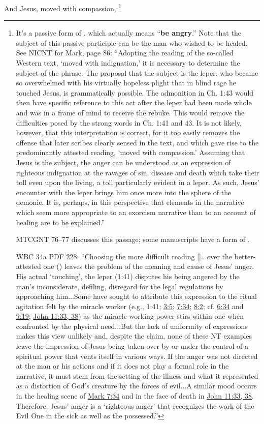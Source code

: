 			And Jesus, moved with compassion,%
				\footnote{%
					It's a passive form of , which actually means ``\textbf{be angry}.'' Note that the subject of this passive participle can be the man who wished to be healed. See NICNT for Mark, page 86: ``Adopting the reading of the so-called Western text, `moved with indignation,' it is necessary to determine the subject of the phrase. The proposal that the subject is the leper, who became so overwhelmed with his virtually hopeless plight that in blind rage he touched Jesus, is grammatically possible. The admonition in Ch. 1:43 would then have specific reference to this act after the leper had been made whole and was in a frame of mind to receive the rebuke. This would remove the difficulties posed by the strong words in Ch. 1:41 and 43. It is not likely, however, that this interpretation is correct, for it too easily removes the offense that later scribes clearly sensed in the text, and which gave rise to the predominantly attested reading, `moved with compassion.' Assuming that Jesus is the subject, the anger can be understood as an expression of righteous indignation at the ravages of sin, disease and death which take their toll even upon the living, a toll particularly evident in a leper. As such, Jesus' encounter with the leper brings him once more into the sphere of the demonic. It is, perhaps, in this perspective that elements in the narrative which seem more appropriate to an exorcism narrative than to an account of healing are to be explained.''
					
					MTCGNT 76--77 discusses this passage; some manuscripts have a form of .
					
					WBC 34a PDF 228: ``Choosing the more difficult reading []...over the better-attested one () leaves the problem of the meaning and cause of Jesus' anger. His actual `touching', the leper (1:41) disputes his being angered by the man's inconsiderate, defiling, disregard for the legal regulations by approaching him...Some have sought to attribute this expression to the ritual agitation felt by the miracle worker (e.g., 1:41; \hyperref[MARK-3-5]{3:5}; \hyperref[MARK-7-34]{7:34}; \hyperref[MARK-8-2]{8:2}; cf. \hyperref[MARK-6-34]{6:34} and \hyperref[MARK-9-19]{9:19}; \hyperref[JOHN-11-33]{John 11:33, 38}) as the miracle-working power stirs within one when confronted by the physical need...But the lack of uniformity of expressions makes this view unlikely and, despite the claim, none of these NT examples leave the impression of Jesus being taken over by or under the control of a spiritual power that vents itself in various ways. If the anger was not directed at the man or his actions and if it does not play a formal role in the narrative, it must stem from the setting of the illness and what it represented as a distortion of God's creature by the forces of evil...A similar mood occurs in the healing scene of \hyperref[MARK-7-34]{Mark 7:34} and in the face of death in \hyperref[JOHN-11-33]{John 11:33, 38}. Therefore, Jesus' anger is a `righteous anger' that recognizes the work of the Evil One in the sick as well as the possessed.''
					}
